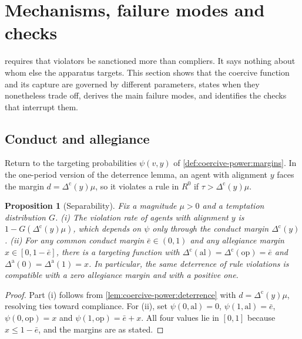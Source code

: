 \documentclass[11pt,letterpaper]{article}
\newtheorem{proposition}[theorem]{Proposition}
\theoremstyle{definition}
\theoremstyle{remark}
\begin{document}
\section{Mechanisms, failure modes and checks}
\label{sec:mechanisms}

 requires that violators be sanctioned more than compliers. It says nothing about whom else the apparatus targets. This section shows that the coercive function and its capture are governed by different parameters, states when they nonetheless trade off, derives the main failure modes, and identifies the checks that interrupt them.

\subsection{Conduct and allegiance}

Return to the targeting probabilities $\psi(v,y)$ of \cref{def:coercive-power:margins}. In the one-period version of the deterrence lemma, an agent with alignment $y$ faces the margin $d = \Delta^{\mathrm{c}}(y)\mu$, so it violates a rule in $R^0$ if $\tau > \Delta^{\mathrm{c}}(y)\mu$.

\begin{proposition}[Separability]
\label{prop:coercive-power:separability}
Fix a magnitude $\mu > 0$ and a temptation distribution $G$. (i) The violation rate of agents with alignment $y$ is $1 - G(\Delta^{\mathrm{c}}(y)\mu)$, which depends on $\psi$ only through the conduct margin $\Delta^{\mathrm{c}}(y)$. (ii) For any common conduct margin $\bar e \in (0,1)$ and any allegiance margin $x \in [0, 1-\bar e]$, there is a targeting function with $\Delta^{\mathrm{c}}(\mathrm{al}) = \Delta^{\mathrm{c}}(\mathrm{op}) = \bar e$ and $\Delta^{\mathrm{a}}(0) = \Delta^{\mathrm{a}}(1) = x$. In particular, the same deterrence of rule violations is compatible with a zero allegiance margin and with a positive one.
\end{proposition}

\begin{proof}
Part (i) follows from \cref{lem:coercive-power:deterrence} with $d = \Delta^{\mathrm{c}}(y)\mu$, resolving ties toward compliance. For (ii), set $\psi(0,\mathrm{al}) = 0$, $\psi(1,\mathrm{al}) = \bar e$, $\psi(0,\mathrm{op}) = x$ and $\psi(1,\mathrm{op}) = \bar e + x$. All four values lie in $[0,1]$ because $x \le 1 - \bar e$, and the margins are as stated.
\end{proof}
\end{document}
